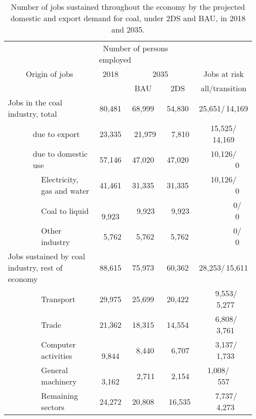 \documentclass[12pt,english]{article}
\begin{document}
\begin{table}[!t]
	\centering
	\small
	\begin{tabular}{lp{20pt}lcccc}
		\toprule
		\multicolumn{3}{c}{} &\multicolumn{3}{l}{\ Number of persons employed\ } &   \\ 
		\multicolumn{3}{c}{Origin of jobs} & 2018 & \multicolumn{2}{c}{2035} & Jobs at risk  \\ 
		\multicolumn{3}{c}{} & &  BAU & 2DS & all/transition\\ 
		\midrule
		\multicolumn{3}{l}{Jobs in the coal industry, total} & 80,481 &68,999   & 54,830 & 25,651/\,14,169\\ 
		\midrule
		\ \ \ \ & \multicolumn{2}{l}{due to export}  	   & 23,335 &\ 21,979  & \ \,7,810 & \,15,525/\,14,169\\ 
		& \multicolumn{2}{l}{due to domestic use}  & 57,146 & 47,020  & 47,020 & \,10,126/\,\ \ \ \ \ \ \ 0\\ 
		& 	 & Electricity, gas and water 		   & 41,461 & 31,335  & 31,335 & \,10,126/\,\ \ \ \ \ \ \ 0\\ 
		&    & Coal to liquid & \ \,9,923  &\ \,9,923 &\ \,9,923 & \,\ \ \ \ \ \ \ 0/\,\ \ \ \ \ \ \ 0\\ 
		&    & Other industry &\ 5,762 &\ 5,762 &\ 5,762    & \,\ \ \ \ \ \ \ 0/\,\ \ \ \ \ \ \ 0 \\ 
		\midrule
		\multicolumn{3}{l}{Jobs sustained by coal industry, rest of economy}  & 88,615 & 75,973  & 60,362 & 28,253/\,15,611\\ 
		\midrule
		& 						 & Transport & 29,975 & 25,699  &  20,422  & \ \,9,553/ \ 5,277\\ 
		& 						 & Trade & 21,362& 18,315 &  14,554  &\ \,6,808/ \ 3,761 \\ 
		& 						 & Computer activities & \ \,9,844& \, 8,440 & \ \,6,707   &\ \,3,137/ \ 1,733\\
		& 						 & General machinery &\ \,3,162 & \ \,2,711  &  \ \,2,154 &\ \,1,008/ \ \ \ \,557 \\  
		& 						 & Remaining sectors & 24,272 & 20,808&  \ 16,535  &\ \,7,737/ \ 4,273 \\  													
		\bottomrule
	\end{tabular}
	\caption{\label{coalExport_BAUvs2DS_2035}Number of jobs sustained throughout the economy by the projected domestic and export demand for coal, under 2DS and BAU, in 2018 and 2035.}
\end{table}
\end{document}

